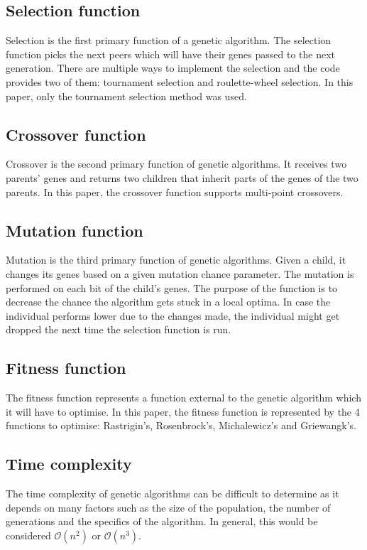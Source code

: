 \documentclass[conference]{IEEEtran}
\begin{document}
\subsection{Selection function}
Selection is the first primary function of a genetic algorithm. The selection function picks the next peers which will have
their genes passed to the next generation. There are multiple ways to implement the selection and the code provides two of them:
tournament selection and roulette-wheel selection. In this paper, only the tournament selection method was used.

\subsection{Crossover function}
Crossover is the second primary function of genetic algorithms. It receives two parents' genes and returns two children that
inherit parts of the genes of the two parents. In this paper, the crossover function supports multi-point crossovers.

\subsection{Mutation function}
Mutation is the third primary function of genetic algorithms. Given a child, it changes its genes based on a given mutation chance
parameter. The mutation is performed on each bit of the child's genes. The purpose of the function is to decrease the chance
the algorithm gets stuck in a local optima. In case the individual performs lower due to the changes made, the individual might
get dropped the next time the selection function is run.

\subsection{Fitness function}
The fitness function represents a function external to the genetic algorithm which it will have to optimise. In this paper, the fitness
function is represented by the 4 functions to optimise: Rastrigin's, Rosenbrock's, Michalewicz's and Griewangk's.

\subsection{Time complexity}
The time complexity of genetic algorithms can be difficult to determine as it depends on many factors such as the size of the population,
the number of generations and the specifics of the algorithm. In general, this would be considered $\mathcal{O}(n^2)$ or $\mathcal{O}(n^3)$.
\end{document}

